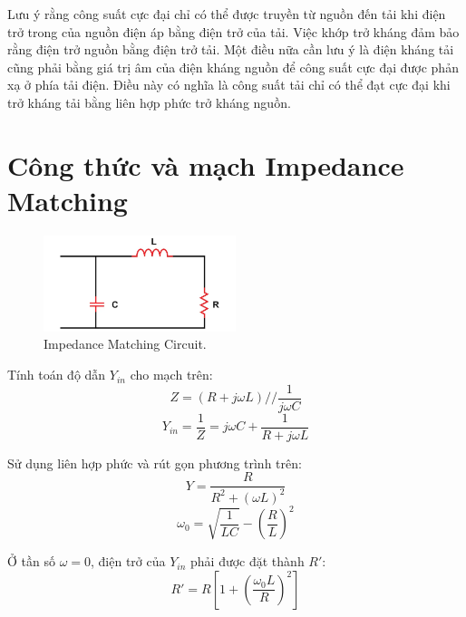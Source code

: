         Lưu ý rằng công suất cực đại chỉ có thể được truyền từ nguồn đến tải khi điện trở trong của nguồn điện áp bằng điện trở của tải. 
        Việc khớp trở kháng đảm bảo rằng điện trở nguồn bằng điện trở tải. 
        Một điều nữa cần lưu ý là điện kháng tải cũng phải bằng giá trị âm của điện kháng nguồn để công suất cực đại được phản xạ ở phía tải điện. 
        Điều này có nghĩa là công suất tải chỉ có thể đạt cực đại khi trở kháng tải bằng liên hợp phức trở kháng nguồn.\cite{allaboutcircuits_impedance}

    \section{Công thức và mạch Impedance Matching}
        \begin{figure}[h]
            \centering
            \includegraphics[width=0.5\textwidth]{figures/impedance_matching_circuit.png}
            \caption{Impedance Matching Circuit.}
            \label{fig:impedance_matching_circuit}
        \end{figure}

        Tính toán độ dẫn $Y_{in}$ cho mạch trên:
        \begin{equation}
            Z = \left(R + j\omega L\right) // \frac{1}{j\omega C}
        \end{equation}
        \begin{equation}
            Y_{in} = \frac{1}{Z} = j\omega C + \frac{1}{R + j\omega L}
        \end{equation}

        Sử dụng liên hợp phức và rút gọn phương trình trên:
        \begin{equation}
            Y = \frac{R}{R^2 + \left(\omega L\right)^2}
        \end{equation}
        \begin{equation}
            \omega_0 = \sqrt{\frac{1}{LC}} - \left(\frac{R}{L}\right)^2
        \end{equation}

        Ở tần số $\omega=0$, điện trở của $Y_{in}$ phải được đặt thành $R'$:
        \begin{equation}
            R' = R\left[1 + \left(\frac{\omega_0 L}{R}\right)^2\right]
        \end{equation}

